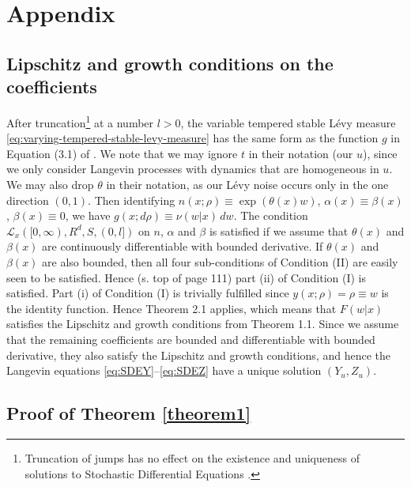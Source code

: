 \documentclass[a4paper,12pt]{elsarticle}
\numberwithin{equation}{section}
\theoremstyle{plain}
\theoremstyle{definition}
\theoremstyle{remark}
\numberwithin{equation}{section}
\newcommand{\1}{\mathbf 1}
\begin{document}
\appendix

\section{Appendix}

\subsection{Lipschitz and growth conditions on the coefficients} 
\label{subsec:Lip-gro}
After truncation\footnote{Truncation of jumps has no effect on the existence and 
uniqueness of solutions to Stochastic Differential Equations \cite{Applebaum}.} 
at a number $l > 0$, the variable tempered stable L\'evy 
measure 
\eqref{eq:varying-tempered-stable-levy-measure}
has the same form as the function $g$ in Equation (3.1) of 
\cite{Tsuchiya1992}.  
We note that we may ignore $t$ in their notation (our $u$), since we only 
consider Langevin processes with dynamics that are homogeneous in $u$.
We may also drop $\theta$ in their notation, as our L\'evy noise occurs only 
in the one direction $(0,1)$. 
Then identifying $n(x;\rho) \equiv \exp(\theta(x) w)$, 
$\alpha(x) \equiv \beta(x)$, $\beta(x) \equiv 0$, 
we have $g(x;d\rho) \equiv \nu(w|x)\,dw$. 
The condition $\mathcal L_x([0,\infty), R^d, S, (0,l])$ on $n$, $\alpha$ and 
$\beta$ is satisfied if we assume that $\theta(x)$ and $\beta(x)$ are 
continuously differentiable with bounded derivative. 
If $\theta(x)$ and $\beta(x)$ are also bounded, then all four sub-conditions of 
Condition (II) are easily seen to be satisfied.  
Hence (s. top of page 111) part (ii) of Condition (I) is satisfied. 
Part (i) of Condition (I) is trivially fulfilled since 
$y(x; \rho) = \rho \equiv w$ is the identity function. 
Hence Theorem 2.1 applies, which means that $F(w|x)$ satisfies the Lipschitz 
and growth conditions from Theorem 1.1. 
Since we assume that the remaining coefficients are bounded and differentiable 
with bounded derivative, they also satisfy the Lipschitz and growth conditions, 
and hence the Langevin equations \eqref{eq:SDEY}--\eqref{eq:SDEZ} have a unique 
solution $(Y_u, Z_u)$.


\subsection{Proof of Theorem \ref{theorem1}}
\end{document}
